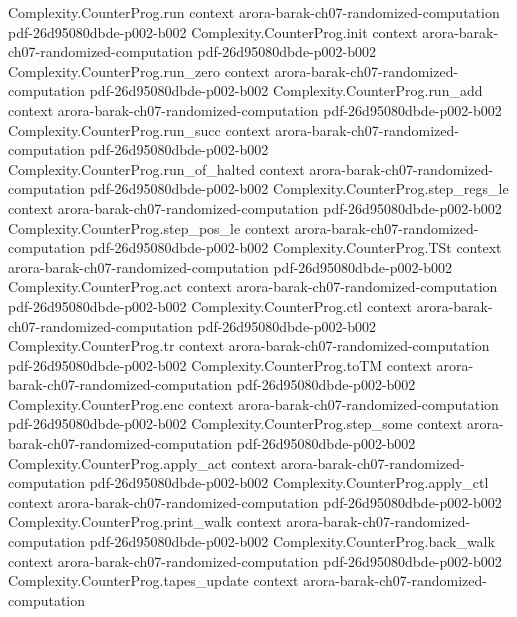 \begin{theorem}
\proofstep
  {Complexity.CounterProg.run}
  {context}
  {arora-barak-ch07-randomized-computation}
  {pdf-26d95080dbde-p002-b002}
\proofstep
  {Complexity.CounterProg.init}
  {context}
  {arora-barak-ch07-randomized-computation}
  {pdf-26d95080dbde-p002-b002}
\proofstep
  {Complexity.CounterProg.run_zero}
  {context}
  {arora-barak-ch07-randomized-computation}
  {pdf-26d95080dbde-p002-b002}
\proofstep
  {Complexity.CounterProg.run_add}
  {context}
  {arora-barak-ch07-randomized-computation}
  {pdf-26d95080dbde-p002-b002}
\proofstep
  {Complexity.CounterProg.run_succ}
  {context}
  {arora-barak-ch07-randomized-computation}
  {pdf-26d95080dbde-p002-b002}
\proofstep
  {Complexity.CounterProg.run_of_halted}
  {context}
  {arora-barak-ch07-randomized-computation}
  {pdf-26d95080dbde-p002-b002}
\proofstep
  {Complexity.CounterProg.step_regs_le}
  {context}
  {arora-barak-ch07-randomized-computation}
  {pdf-26d95080dbde-p002-b002}
\proofstep
  {Complexity.CounterProg.step_pos_le}
  {context}
  {arora-barak-ch07-randomized-computation}
  {pdf-26d95080dbde-p002-b002}
\proofstep
  {Complexity.CounterProg.TSt}
  {context}
  {arora-barak-ch07-randomized-computation}
  {pdf-26d95080dbde-p002-b002}
\proofstep
  {Complexity.CounterProg.act}
  {context}
  {arora-barak-ch07-randomized-computation}
  {pdf-26d95080dbde-p002-b002}
\proofstep
  {Complexity.CounterProg.ctl}
  {context}
  {arora-barak-ch07-randomized-computation}
  {pdf-26d95080dbde-p002-b002}
\proofstep
  {Complexity.CounterProg.tr}
  {context}
  {arora-barak-ch07-randomized-computation}
  {pdf-26d95080dbde-p002-b002}
\proofstep
  {Complexity.CounterProg.toTM}
  {context}
  {arora-barak-ch07-randomized-computation}
  {pdf-26d95080dbde-p002-b002}
\proofstep
  {Complexity.CounterProg.enc}
  {context}
  {arora-barak-ch07-randomized-computation}
  {pdf-26d95080dbde-p002-b002}
\proofstep
  {Complexity.CounterProg.step_some}
  {context}
  {arora-barak-ch07-randomized-computation}
  {pdf-26d95080dbde-p002-b002}
\proofstep
  {Complexity.CounterProg.apply_act}
  {context}
  {arora-barak-ch07-randomized-computation}
  {pdf-26d95080dbde-p002-b002}
\proofstep
  {Complexity.CounterProg.apply_ctl}
  {context}
  {arora-barak-ch07-randomized-computation}
  {pdf-26d95080dbde-p002-b002}
\proofstep
  {Complexity.CounterProg.print_walk}
  {context}
  {arora-barak-ch07-randomized-computation}
  {pdf-26d95080dbde-p002-b002}
\proofstep
  {Complexity.CounterProg.back_walk}
  {context}
  {arora-barak-ch07-randomized-computation}
  {pdf-26d95080dbde-p002-b002}
\proofstep
  {Complexity.CounterProg.tapes_update}
  {context}
  {arora-barak-ch07-randomized-computation}

\end{theorem}
